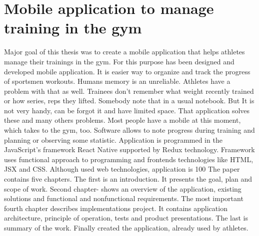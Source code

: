 \chapter*{Mobile application to manage training in the gym}

Major goal of this thesis was to create a mobile application that helps athletes manage their trainings in the gym. For this purpose has been designed and developed mobile application. It is easier way to organize and track the progress of sportsmen workouts.
Humans memory is an unreliable. Athletes have a problem with that as well. Trainees don’t remember what weight recently trained or how series, reps they lifted. Somebody note that in a usual notebook. But It is not very handy, can be forgot it and have limited space.
That application solves these and many others problems. Most people have a mobile at this moment, which takes to the gym, too. Software allows to note progress during training and planning or observing some statistic.
Application is programmed in the JavaScript’s framework React Native supported by Redux technology. Framework uses functional approach to programming and frontends technologies like HTML, JSX and CSS. Although used web technologies, application is 100%
The paper contains five chapters. The first is an introduction. It presents the goal, plan and scope of work. Second chapter- shows an overview of the application, existing solutions and functional and nonfunctional requirements. The most important fourth chapter describes implementations project. It contains application architecture, principle of operation, tests and product presentations. The last is summary of the work.
Finally created the application, already used by athletes.

